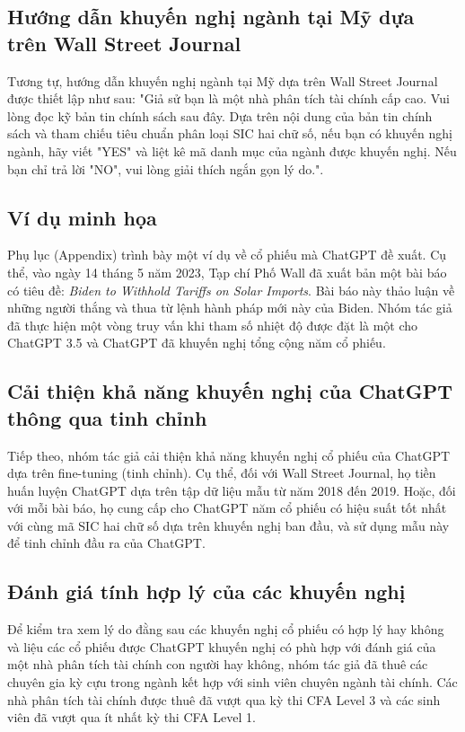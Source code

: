 \documentclass[a4paper,12pt]{article}
\begin{document}
\subsection{Hướng dẫn khuyến nghị ngành tại Mỹ dựa trên Wall Street Journal}
Tương tự, hướng dẫn khuyến nghị ngành tại Mỹ dựa trên Wall Street Journal được thiết lập như sau: "Giả sử bạn là một nhà phân tích tài chính cấp cao. Vui lòng đọc kỹ bản tin chính sách sau đây. Dựa trên nội dung của bản tin chính sách và tham chiếu tiêu chuẩn phân loại SIC hai chữ số, nếu bạn có khuyến nghị ngành, hãy viết "YES" và liệt kê mã danh mục của ngành được khuyến nghị. Nếu bạn chỉ trả lời "NO", vui lòng giải thích ngắn gọn lý do.".

\subsection{Ví dụ minh họa}
Phụ lục (Appendix) trình bày một ví dụ về cổ phiếu mà ChatGPT đề xuất. Cụ thể, vào ngày 14 tháng 5 năm 2023, Tạp chí Phố Wall đã xuất bản một bài báo có tiêu đề: \textit{Biden to Withhold Tariffs on Solar Imports}. Bài báo này thảo luận về những người thắng và thua từ lệnh hành pháp mới này của Biden. Nhóm tác giả đã thực hiện một vòng truy vấn khi tham số nhiệt độ được đặt là một cho ChatGPT 3.5 và ChatGPT đã khuyến nghị tổng cộng năm cổ phiếu.

\subsection{Cải thiện khả năng khuyến nghị của ChatGPT thông qua tinh chỉnh}
Tiếp theo, nhóm tác giả cải thiện khả năng khuyến nghị cổ phiếu của ChatGPT dựa trên fine-tuning (tinh chỉnh). Cụ thể, đối với Wall Street Journal, họ tiền huấn luyện ChatGPT dựa trên tập dữ liệu mẫu từ năm 2018 đến 2019. Hoặc, đối với mỗi bài báo, họ cung cấp cho ChatGPT năm cổ phiếu có hiệu suất tốt nhất với cùng mã SIC hai chữ số dựa trên khuyến nghị ban đầu, và sử dụng mẫu này để tinh chỉnh đầu ra của ChatGPT.


\subsection{Đánh giá tính hợp lý của các khuyến nghị}
Để kiểm tra xem lý do đằng sau các khuyến nghị cổ phiếu có hợp lý hay không và liệu các cổ phiếu được ChatGPT khuyến nghị có phù hợp với đánh giá của một nhà phân tích tài chính con người hay không, nhóm tác giả đã thuê các chuyên gia kỳ cựu trong ngành kết hợp với sinh viên chuyên ngành tài chính. Các nhà phân tích tài chính được thuê đã vượt qua kỳ thi CFA Level 3 và các sinh viên đã vượt qua ít nhất kỳ thi CFA Level 1.
\end{document}
